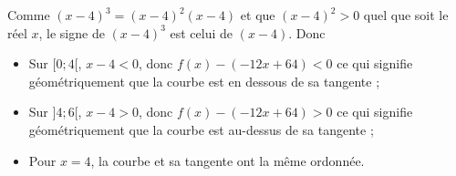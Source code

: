 	Comme $(x - 4)^3 = (x - 4)^2 (x - 4)$ et que $(x - 4)^2 > 0$ quel que soit le réel $x$, le signe de $(x - 4)^3$ est celui de $(x - 4)$. Donc
	\begin{itemize}
		\item Sur $[0; 4[$, $x - 4 < 0$, donc $f(x) - (-12x + 64) < 0$ ce qui signifie géométriquement que la courbe est en dessous de sa tangente ;
		\item Sur $]4; 6[$, $x - 4 > 0$, donc $f(x) - (-12x + 64) > 0$ ce qui signifie géométriquement que la courbe est au-dessus de sa tangente ;
		\item Pour $x = 4$, la courbe et sa tangente ont la même ordonnée.
	\end{itemize}
